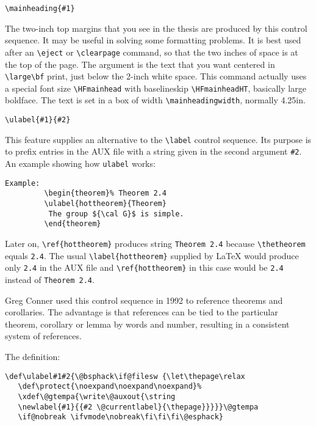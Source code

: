 \medskip

\verb|\mainheading{#1}|

\noindent The two-inch top margins that you see in the thesis are
produced by this control sequence. It may be useful in solving some
formatting problems. It is best used after an \verb|\eject| or
\verb|\clearpage| command, so that the two inches of space is at the top
of the page. The argument is the text that you want centered in
\verb|\large\bf| print, just below the 2-inch white space. This command
actually uses a special font size \verb|\HFmainhead| with baselineskip
\verb|\HFmainheadHT|, basically large boldface. The text is set in a box
of width \verb|\mainheadingwidth|, normally 4.25in.

\medskip

\verb|\ulabel{#1}{#2}|

\noindent This feature supplies an alternative to the \verb|\label|
control sequence. Its purpose is to prefix entries in the AUX file with
a string given in the second argument \verb|#2|. An example showing how
{\tt ulabel} works:
\begin{verbatim}
Example:
         \begin{theorem}% Theorem 2.4
         \ulabel{hottheorem}{Theorem}
          The group ${\cal G}$ is simple.
         \end{theorem}
\end{verbatim}
Later on, \verb"\ref{hottheorem}" produces string \verb"Theorem 2.4"
because \verb"\thetheorem" equals \verb"2.4". The usual
\verb"\label{hottheorem}" supplied by \LaTeX{} would produce only
\verb"2.4" in the AUX file and \verb"\ref{hottheorem}" in this case
would be \verb"2.4" instead of \verb"Theorem 2.4".


\noindent Greg Conner used this control sequence in 1992 to reference
theorems and corollaries. The advantage is that references can be tied
to the particular theorem, corollary or lemma by words and number,
resulting in a consistent system of references.


\noindent The definition:

\begin{verbatim}
\def\ulabel#1#2{\@bsphack\if@filesw {\let\thepage\relax
   \def\protect{\noexpand\noexpand\noexpand}%
   \xdef\@gtempa{\write\@auxout{\string
   \newlabel{#1}{{#2 \@currentlabel}{\thepage}}}}}\@gtempa
   \if@nobreak \ifvmode\nobreak\fi\fi\fi\@esphack}
\end{verbatim}

\medskip

